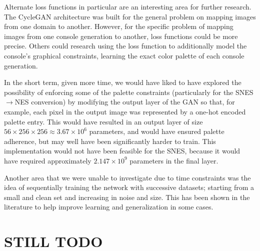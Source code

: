 \documentclass[10pt,twocolumn,letterpaper]{article}
\begin{document}
Alternate loss functions in particular are an interesting area for further research. The CycleGAN architecture was built for the general problem on mapping images from one domain to another. However, for the specific problem of mapping images from one console generation to another, loss functions could be more precise. Others could research using the loss function to additionally model the console's graphical constraints, learning the exact color palette of each console generation.

In the short term, given more time, we would have liked to have explored the possibility of enforcing some of the palette constraints (particularly for the SNES$\rightarrow$NES conversion) by modifying the output layer of the GAN so that, for example, each pixel in the output image was represented by a one-hot encoded palette entry. This would have resulted in an output layer of size $56\times256\times256\approx3.67\times10^6$ parameters, and would have ensured palette adherence, but may well have been significantly harder to train. This implementation would not have been feasible for the SNES, because it would have required approximately $2.147\times10^9$ parameters in the final layer.

Another area that we were unable to investigate due to time constraints was the idea of sequentially training the network with successive datasets; starting from a small and clean set and increasing in noise and size. This has been shown in the literature to help improve learning and generalization in some cases.

\section{STILL TODO}
%
%

%

%
\end{document}
